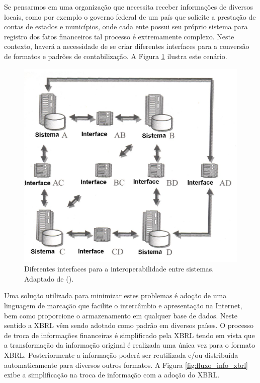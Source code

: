 \documentclass[msc,proposal,hidelot,hideabstract]{ppgccufmg} %
\begin{document}
Se pensarmos em uma organização que necessita receber informações de diversos
locais, como por exemplo o governo federal de um país que solicite a prestação
de contas de estados e municípios,
onde cada ente possui seu próprio sistema para registro dos fatos financeiros
tal processo é extremamente complexo.
Neste contexto, haverá a necessidade de se criar diferentes interfaces para a
conversão de formatos e padrões de contabilização.
A Figura \ref{fig:interfaces} ilustra este cenário.

\begin{figure}[hbtp]
\centering
\includegraphics[width=.75\textwidth]{img/interfaces.png}
\caption{Diferentes interfaces para a interoperabilidade entre sistemas. Adaptado de (\cite{bergeron2004essentials}).}
\label{fig:interfaces}
\end{figure}

Uma solução utilizada para minimizar estes problemas é adoção de uma linguagem de marcação que facilite o intercâmbio e apresentação na Internet, bem como proporcione o armazenamento em qualquer base de dados. Neste sentido a XBRL vêm sendo adotado como padrão em diversos países. O processo de troca de informações financeiras é simplificado pela XBRL tendo em vista que a transformação da informação original é realizada uma única vez para o formato XBRL. Posteriormente a informação poderá ser reutilizada e/ou distribuída automaticamente para diversos outros formatos. A Figura \ref{fig:fluxo_info_xbrl} exibe a simplificação na troca de informação com a adoção do XBRL.
\end{document}
